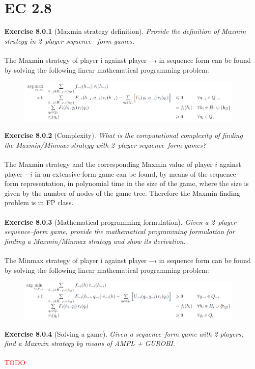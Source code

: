 \section{EC 2.8}

\textbf{Exercise 8.0.1} (Maxmin strategy definition). \textit{Provide the definition of Maxmin strategy in 2–player sequence– form games.}\\\\
The Maxmin strategy of player i against player $-i$ in sequence form can be found by solving the following linear mathematical programming problem:
\begin{figure}[H]
\centering
\includegraphics[width=\textwidth]{images/img_2_8_01.png}
\end{figure}
\noindent
\textbf{Exercise 8.0.2} (Complexity). \textit{What is the computational complexity of finding the Maxmin/Minmax strategy with 2–player sequence–form games?}\\\\
The Maxmin strategy and the corresponding Maxmin value of player $i$ against player $-i$ in an extensive-form game can be found, by means of the sequence-form representation, in polynomial time in the size of the game, where the size is given by the number of nodes
of the game tree. Therefore the Maxmin finding problem is in \textsf{FP} class.\\\\
\textbf{Exercise 8.0.3} (Mathematical programming formulation). \textit{Given a 2–player sequence–form game, provide the mathematical programming formulation for finding a Maxmin/Minmax strategy and show its derivation.}\\\\
The Minmax strategy of player i against player $-i$ in sequence form can be found by solving the following linear mathematical programming problem:
\begin{figure}[H]
\centering
\includegraphics[width=\textwidth]{images/img_2_8_02.png}
\end{figure}
\noindent
\textbf{Exercise 8.0.4} (Solving a game). \textit{Given a sequence–form game with 2 players, find a Maxmin strategy by means of AMPL + GUROBI.}\\\\
\textcolor{red}{TODO}\\\\

